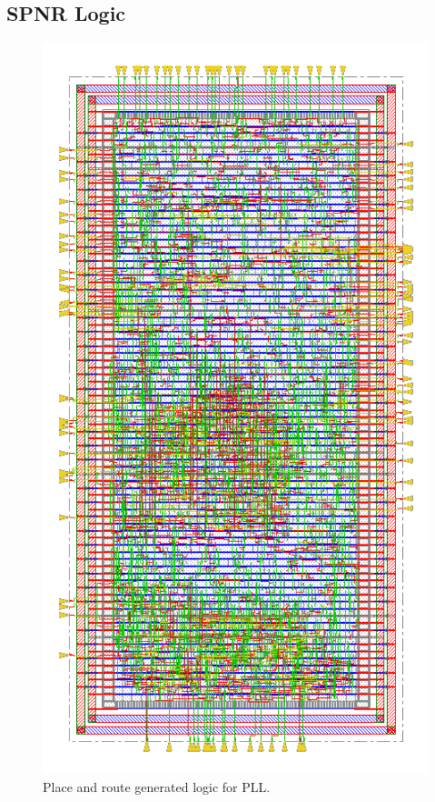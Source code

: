 		\subsection{SPNR Logic}
			\begin{figure}[htb!]
			        \centering
			        \includegraphics[height=0.8\textheight, angle=0]{./figs/layout/pnr_digital}
			    \caption{Place and route generated logic for PLL.}
			\end{figure}
		\FloatBarrier\pagebreak

